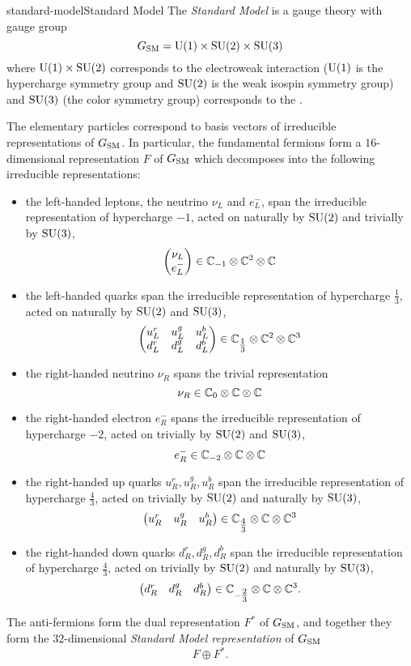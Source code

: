 \begin{topic}{standard-model}{Standard Model}
    The \emph{Standard Model} is a gauge theory with gauge group
    \[ G_\textup{SM} = \textup{U}(1) \times \textup{SU}(2) \times \textup{SU}(3) \]
    where $\textup{U}(1) \times \textup{SU}(2)$ corresponds to the electroweak interaction ($\textup{U}(1)$ is the hypercharge symmetry group and $\textup{SU}(2)$ is the weak isospin symmetry group) and $\textup{SU}(3)$ (the color symmetry group) corresponds to the .

    The elementary particles correspond to basis vectors of irreducible representations of $G_\textup{SM}$. In particular, the fundamental fermions form a $16$-dimensional representation $F$ of $G_\textup{SM}$ which decomposes into the following irreducible representations:
    \begin{itemize}
        \item the left-handed leptons, the neutrino $\nu_L$ and $e^-_L$, span the irreducible representation of hypercharge $-1$, acted on naturally by $\textup{SU}(2)$ and trivially by $\textup{SU}(3)$,
        \[ \begin{pmatrix} \nu_L \\ e^-_L \end{pmatrix} \in \mathbb{C}_{-1} \otimes \mathbb{C}^2 \otimes \mathbb{C} \]
        \item the left-handed quarks span the irreducible representation of hypercharge $\tfrac{1}{3}$, acted on naturally by $\textup{SU}(2)$ and $\textup{SU}(3)$,
        \[ \begin{pmatrix} u^r_L & u^g_L & u^b_L \\ d^r_L & d^g_L & d^b_L \end{pmatrix} \in \mathbb{C}_{\tfrac{1}{3}} \otimes \mathbb{C}^2 \otimes \mathbb{C}^3 \]
        \item the right-handed neutrino $\nu_R$ spans the trivial representation
        \[ \nu_R \in \mathbb{C}_0 \otimes \mathbb{C} \otimes \mathbb{C} \]
        \item the right-handed electron $e^-_R$ spans the irreducible representation of hypercharge $-2$, acted on trivially by $\textup{SU}(2)$ and $\textup{SU}(3)$,
        \[ e^-_R \in \mathbb{C}_{-2} \otimes \mathbb{C} \otimes \mathbb{C} \]
        \item the right-handed up quarks $u^r_R, u^g_R, u^b_R$ span the irreducible representation of hypercharge $\tfrac{4}{3}$, acted on trivially by $\textup{SU}(2)$ and naturally by $\textup{SU}(3)$,
        \[ \begin{pmatrix} u^r_R & u^g_R & u^b_R \end{pmatrix} \in \mathbb{C}_{\tfrac{4}{3}} \otimes \mathbb{C} \otimes \mathbb{C}^3 \]
        \item the right-handed down quarks $d^r_R, d^g_R, d^b_R$ span the irreducible representation of hypercharge $\tfrac{4}{3}$, acted on trivially by $\textup{SU}(2)$ and naturally by $\textup{SU}(3)$,
        \[ \begin{pmatrix} d^r_R & d^g_R & d^b_R \end{pmatrix} \in \mathbb{C}_{-\tfrac{2}{3}} \otimes \mathbb{C} \otimes \mathbb{C}^3 . \]
    \end{itemize}
    The anti-fermions form the dual representation $F^*$ of $G_\textup{SM}$, and together they form the $32$-dimensional \emph{Standard Model representation} of $G_\textup{SM}$
    \[ F \oplus F^* . \]
\end{topic}

